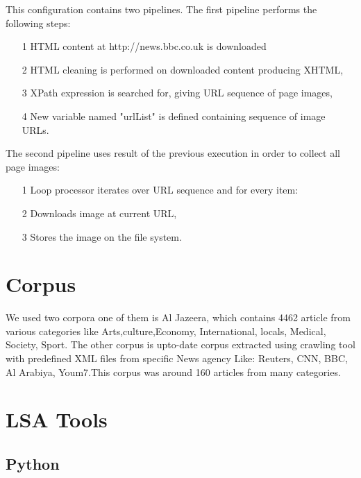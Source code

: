 This configuration contains two pipelines. The first pipeline performs the following steps:
\begin{itemize}
\item [1] HTML content at http://news.bbc.co.uk is downloaded
\item [2] HTML cleaning is performed on downloaded content producing XHTML,
\item [3] XPath expression is searched for, giving URL sequence of page images,
\item [4] New variable named "urlList" is defined containing sequence of image URLs.
\end{itemize}
The second pipeline uses result of the previous execution in order to collect all page images:
\begin{itemize}
\item [1] Loop processor iterates over URL sequence and for every item:
\item [2] Downloads image at current URL,
\item [3] Stores the image on the file system.
\end{itemize}


\section{Corpus}
We used two corpora one of them is Al Jazeera, which contains 4462 article from various categories like Arts,culture,Economy, International, locals, Medical, Society, Sport.
The other corpus is upto-date corpus extracted using crawling tool with predefined XML files from specific News agency Like: Reuters, CNN, BBC, Al Arabiya, Youm7.This corpus was around 160 articles from many categories.


\section{LSA Tools}
\subsection{Python}
